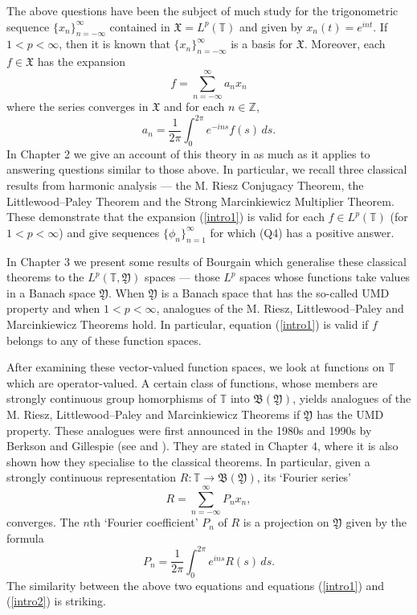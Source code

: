 \documentclass[honours,12pt]{unswthesis}
\newcommand{\T}{\mathbb{T}}
\newcommand{\Z}{\mathbb{Z}}
\newcommand{\B}{\mathfrak{B}}
\newcommand{\X}{\mathfrak{X}}
\newcommand{\Y}{\mathfrak{Y}}
\numberwithin{equation}{section}
\begin{document}
The above questions have been the subject of much study for the trigonometric
sequence $\{x_n\}_{n=-\infty}^{\infty}$ contained in $\X=L^p(\T)$ and given by
$x_n(t)=e^{int}$. If $1<p<\infty$, then it is known that
$\{x_n\}_{n=-\infty}^{\infty}$ is a basis for $\X$. Moreover, each $f\in\X$ has
the expansion
\begin{equation}\label{intro1}
f=\sum_{n=-\infty}^{\infty}a_nx_n
\end{equation}
where the series converges in $\X$ and for each $n\in\Z$,
\begin{equation}\label{intro2}
a_n=\frac{1}{2\pi}\int_0^{2\pi}e^{-ins}f(s)\,ds.
\end{equation}
In Chapter 2 we give an account of this theory in as much as it applies to
answering questions similar to those above. In particular, we recall three
classical results from harmonic analysis --- the M. Riesz Conjugacy Theorem,
the Littlewood--Paley Theorem and the Strong Marcinkiewicz Multiplier Theorem.
These demonstrate that the expansion (\ref{intro1}) is valid for each 
$f\in L^p(\T)$ (for $1<p<\infty$) and give sequences
$\{\phi_n\}_{n=1}^{\infty}$ for which (Q4) has a positive answer.

In Chapter 3 we present some results of Bourgain
which generalise these classical theorems to the $L^p(\T,\Y)$ spaces
--- those $L^p$ spaces whose functions take values in a Banach space $\Y$. 
When
$\Y$ is a Banach space that has the so-called UMD property and when 
$1<p<\infty$,
analogues of the M. Riesz, Littlewood--Paley and Marcinkiewicz Theorems hold. In
particular, equation (\ref{intro1}) is valid if $f$ belongs to any of these
function spaces.

After examining these vector-valued function spaces, we look at functions on
$\T$ which are operator-valued. A certain class of functions, whose members are
strongly continuous group homorphisms of $\T$ into $\B(\Y)$, yields analogues of
the M. Riesz, Littlewood--Paley and Marcinkiewicz Theorems if
$\Y$ has the UMD property.
These analogues were first announced in the 1980s and 1990s by Berkson
and Gillespie (see \cite{BG Fourier} and \cite{BG Spectral}). They are stated
in Chapter 4, where it is also shown how they
specialise to the classical theorems. In particular, given a strongly continuous
representation $R:\T\rightarrow\B(\Y)$, its `Fourier series'
\[R=\sum_{n=-\infty}^{\infty}P_nx_n,\]
converges. The $n$th `Fourier coefficient' $P_n$ of $R$ is a projection
on $\Y$ given by the formula
\[P_n=\frac{1}{2\pi}\int_0^{2\pi}e^{ins}R(s)\,ds.\]
The similarity between the above two equations and equations (\ref{intro1}) and
(\ref{intro2}) is striking.
\end{document}
